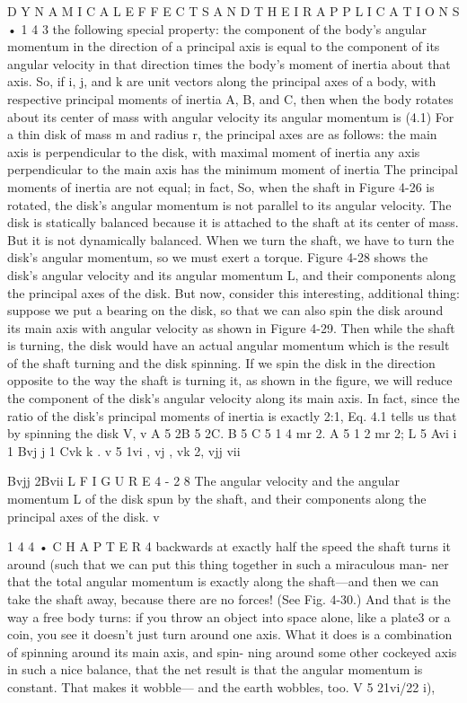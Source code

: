 \documentclass[10pt,oneside]{article}
\begin{document}
D Y N A M I C A L  E F F E C T S  A N D  T H E I R  A P P L I C A T I O N S • 1 4 3 the following special property: the component of the body’s angular momentum in the direction of a principal axis is equal to the component of its angular velocity in that direction times the body’s moment of inertia about that axis. So, if i, j, and k are unit vectors along the principal axes of a body, with respective principal moments of inertia A, B, and C, then when the body rotates about its center of mass with angular velocity its angular momentum is (4.1) For a thin disk of mass m and radius r, the principal axes are as follows: the main axis is perpendicular to the disk, with maximal moment of inertia any axis perpendicular to the main axis has the minimum moment of inertia The principal moments of inertia are not equal; in fact, So, when the shaft in Figure 4-26 is rotated, the disk’s angular momentum is not parallel to its angular velocity. The disk is statically balanced because it is attached to the shaft at its center of mass. But it is not dynamically balanced. When we turn the shaft, we have to turn the disk’s angular momentum, so we must exert a torque. Figure 4-28 shows the disk’s angular velocity and its angular momentum L, and their components along the principal axes of the disk. But now, consider this interesting, additional thing: suppose we put a bearing on the disk, so that we can also spin the disk around its main axis with angular velocity as shown in Figure 4-29. Then while the shaft is turning, the disk would have an actual angular momentum which is the result of the shaft turning and the disk spinning. If we spin the disk in the direction opposite to the way the shaft is turning it, as shown in the figure, we will reduce the component of the disk’s angular velocity along its main axis. In fact, since the ratio of the disk’s principal moments of inertia is exactly 2:1, Eq. 4.1 tells us that by spinning the disk V, v A 5 2B 5 2C. B 5 C 5 1 4 mr 2. A 5 1 2 mr 2; L 5 Avi i 1 Bvj j 1 Cvk k . v 5 1vi , vj , vk 2, vjj vii\par

Bvjj 2Bvii L F I G U R E  4 - 2 8 The angular velocity and the angular momentum L of the disk spun by the shaft, and their components along the principal axes of the disk. v\par

1 4 4 • C H A P T E R  4 backwards at exactly half the speed the shaft turns it around (such that we can put this thing together in such a miraculous man- ner that the total angular momentum is exactly along the shaft---and then we can take the shaft away, because there are no forces! (See Fig. 4-30.) And that is the way a free body turns: if you throw an object into space alone, like a plate3 or a coin, you see it doesn’t just turn around one axis. What it does is a combination of spinning around its main axis, and spin- ning around some other cockeyed axis in such a nice balance, that the net result is that the angular momentum is constant. That makes it wobble--- and the earth wobbles, too. V 5 21vi/22  i),\par
\end{document}
